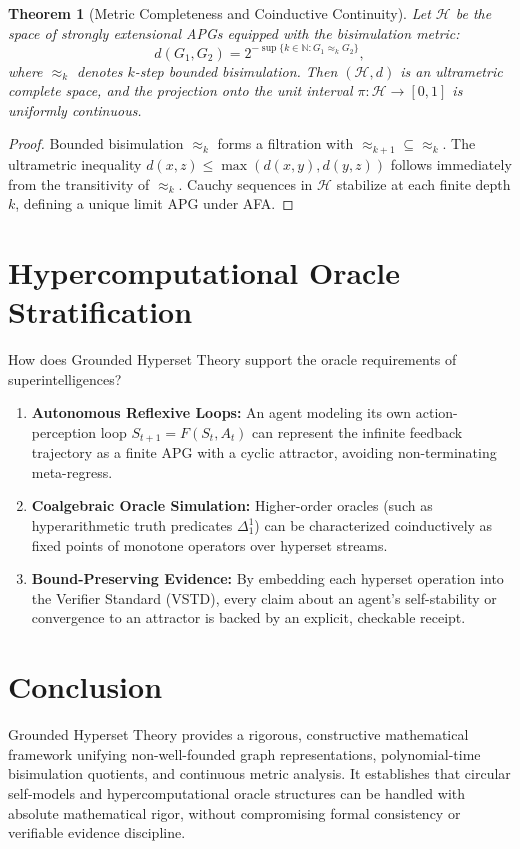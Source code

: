 \documentclass[11pt]{article}
\newtheorem{theorem}{Theorem}[section]
\theoremstyle{definition}
\newcommand{\N}{\mathbb N}
\begin{document}
\begin{theorem}[Metric Completeness and Coinductive Continuity]
Let $\mathcal{H}$ be the space of strongly extensional APGs equipped with the bisimulation metric:
\[
d(G_1, G_2) = 2^{-\sup \{k \in \N : G_1 \approx_k G_2\}},
\]
where $\approx_k$ denotes $k$-step bounded bisimulation. Then $(\mathcal{H}, d)$ is an ultrametric complete space, and the projection onto the unit interval $\pi\colon \mathcal{H} \to [0, 1]$ is uniformly continuous.
\end{theorem}
\begin{proof}
Bounded bisimulation $\approx_k$ forms a filtration with $\approx_{k+1} \subseteq \approx_k$. The ultrametric inequality $d(x, z) \le \max(d(x, y), d(y, z))$ follows immediately from the transitivity of $\approx_k$. Cauchy sequences in $\mathcal{H}$ stabilize at each finite depth $k$, defining a unique limit APG under AFA.
\end{proof}

\section{Hypercomputational Oracle Stratification}
How does Grounded Hyperset Theory support the oracle requirements of superintelligences?
\begin{enumerate}
\item \textbf{Autonomous Reflexive Loops:} An agent modeling its own action-perception loop $S_{t+1} = F(S_t, A_t)$ can represent the infinite feedback trajectory as a finite APG with a cyclic attractor, avoiding non-terminating meta-regress.
\item \textbf{Coalgebraic Oracle Simulation:} Higher-order oracles (such as hyperarithmetic truth predicates $\Delta^1_1$) can be characterized coinductively as fixed points of monotone operators over hyperset streams.
\item \textbf{Bound-Preserving Evidence:} By embedding each hyperset operation into the Verifier Standard (VSTD), every claim about an agent's self-stability or convergence to an attractor is backed by an explicit, checkable receipt.
\end{enumerate}

\section{Conclusion}
Grounded Hyperset Theory provides a rigorous, constructive mathematical framework unifying non-well-founded graph representations, polynomial-time bisimulation quotients, and continuous metric analysis. It establishes that circular self-models and hypercomputational oracle structures can be handled with absolute mathematical rigor, without compromising formal consistency or verifiable evidence discipline.
\end{document}
